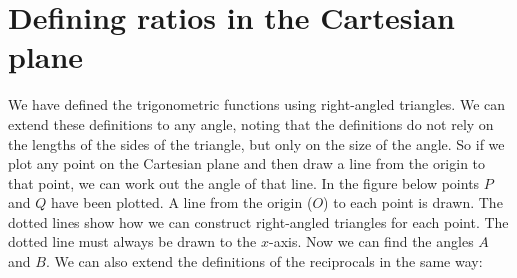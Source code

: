 \section{Defining ratios in the Cartesian plane}

We have defined the trigonometric functions using right-angled triangles. We can extend these definitions to any angle, noting that the definitions do not rely on the lengths of the sides of the triangle, but only on the size of the angle. So if we plot any point on the Cartesian plane and then draw a line from the origin to that point, we can work out the angle of that line. In the figure below points $P$ and $Q$ have been plotted. A line from the origin ($O$) to each point is drawn. The dotted lines show how we can construct right-angled triangles for each point. The dotted line must always be drawn to the $x$-axis. Now we can find the angles $A$ and $B$. We can also extend the definitions of the reciprocals in the same way:


